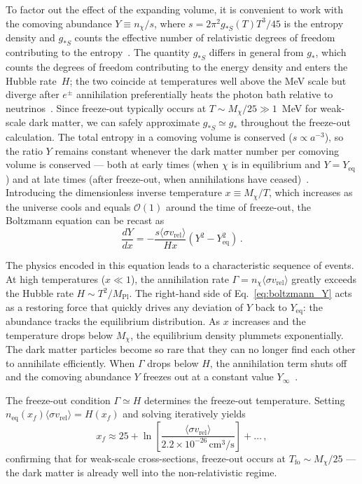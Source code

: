 To factor out the effect of the expanding volume, it is convenient to work with the comoving abundance $Y \equiv n_\chi / s$, where $s = 2\pi^2 g_{*S}(T) T^3 / 45$ is the entropy density and $g_{*S}$ counts the effective number of relativistic degrees of freedom contributing to the entropy~\cite{Cirelli:2024ssz}.
The quantity $g_{*S}$ differs in general from $g_*$, which counts the degrees of freedom contributing to the energy density and enters the Hubble rate~$H$; the two coincide at temperatures well above the MeV scale but diverge after $e^\pm$ annihilation preferentially heats the photon bath relative to neutrinos~\cite{Cirelli:2024ssz}.
Since freeze-out typically occurs at $T \sim M_\chi/25 \gg 1$~MeV for weak-scale dark matter, we can safely approximate $g_{*S} \simeq g_*$ throughout the freeze-out calculation.
The total entropy in a comoving volume is conserved ($s \propto a^{-3}$), so the ratio $Y$ remains constant whenever the dark matter number per comoving volume is conserved --- both at early times (when $\chi$ is in equilibrium and $Y = Y_\mathrm{eq}$) and at late times (after freeze-out, when annihilations have ceased)~\cite{Cirelli:2024ssz}.
Introducing the dimensionless inverse temperature $x \equiv M_\chi/T$, which increases as the universe cools and equals $\mathcal{O}(1)$ around the time of freeze-out, the Boltzmann equation can be recast as~\cite{Cirelli:2024ssz}
\begin{equation}
	\frac{dY}{dx} = -\frac{s \langle \sigma v_\mathrm{rel} \rangle}{Hx} \left(Y^2 - Y_\mathrm{eq}^2\right) \,.
	\label{eq:boltzmann_Y}
\end{equation}

The physics encoded in this equation leads to a characteristic sequence of events.
At high temperatures ($x \ll 1$), the annihilation rate $\Gamma = n_\chi \langle \sigma v_\mathrm{rel} \rangle$ greatly exceeds the Hubble rate $H \sim T^2/M_\mathrm{Pl}$.
The right-hand side of Eq.~\eqref{eq:boltzmann_Y} acts as a restoring force that quickly drives any deviation of $Y$ back to $Y_\mathrm{eq}$: the abundance tracks the equilibrium distribution.
As $x$ increases and the temperature drops below $M_\chi$, the equilibrium density plummets exponentially.
The dark matter particles become so rare that they can no longer find each other to annihilate efficiently.
When $\Gamma$ drops below $H$, the annihilation term shuts off and the comoving abundance $Y$ freezes out at a constant value $Y_\infty$~\cite{Cirelli:2024ssz}.

The freeze-out condition $\Gamma \simeq H$ determines the freeze-out temperature.
Setting $n_\mathrm{eq}(x_f) \langle \sigma v_\mathrm{rel} \rangle = H(x_f)$ and solving iteratively yields~\cite{Cirelli:2024ssz}
\begin{equation}
	x_f \approx 25 + \ln \left[\frac{\langle \sigma v_\mathrm{rel} \rangle}{2.2 \times 10^{-26} \, \mathrm{cm}^3/\mathrm{s}}\right] + \ldots \,,
	\label{eq:xf}
\end{equation}
confirming that for weak-scale cross-sections, freeze-out occurs at $T_\mathrm{fo} \sim M_\chi/25$ --- the dark matter is already well into the non-relativistic regime.


